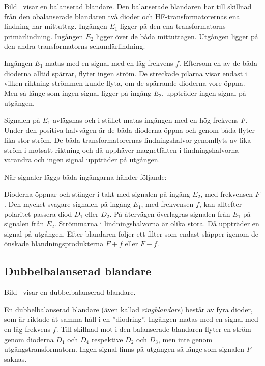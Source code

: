 
Bild~ visar en balanserad blandare.
Den balanserade blandaren har till skillnad från den obalanserade blandaren två
dioder och HF-transformatorernas ena lindning har mittuttag.
Ingången \(E_1\) ligger på den ena transformatorns primärlindning.
Ingången \(E_2\) ligger över de båda mittuttagen.
Utgången ligger på den andra transformatorns sekundärlindning.

Ingången \(E_1\) matas med en signal med en låg frekvens \(f\).
Eftersom en av de båda dioderna alltid spärrar, flyter ingen ström.
De streckade pilarna visar endast i vilken riktning strömmen kunde flyta, om de
spärrande dioderna vore öppna.
Men så länge som ingen signal ligger på ingång \(E_2\), uppträder ingen
signal på utgången.

Signalen på \(E_1\) avlägsnas och i stället matas ingången med en hög
frekvens \(F\).
Under den positiva halvvågen är de båda dioderna öppna och genom båda flyter
lika stor ström.
De båda transformatorernas lindningshalvor genomflyts av lika ström i motsatt
riktning och då upphäver magnetfälten i lindningshalvorna varandra och ingen
signal uppträder på utgången.

När signaler läggs båda ingångarna händer följande:

Dioderna öppnar och stänger i takt med signalen på ingång \(E_2\), med
frekvensen \(F\).
Den mycket svagare signalen på ingång \(E_1\), med frekvensen \(f\), kan
alltefter polaritet passera diod \(D_1\) eller \(D_2\).
På återvägen överlagras signalen från \(E_1\) på signalen från \(E_2\).
Strömmarna i lindningshalvorna är olika stora.
Då uppträder en signal på utgången.
Efter blandaren följer ett filter som endast släpper igenom de önskade
blandningsprodukterna \(F + f\) eller \(F - f\).

\subsection{Dubbelbalanserad blandare}


Bild~ visar en dubbelbalanserad blandare.

En dubbelbalanserad blandare (även kallad \emph{ringblandare}) består av fyra
dioder, som är riktade åt samma håll i en ''diodring''.
Ingången matas med en signal med en låg frekvens \(f\).
Till skillnad mot i den balanserade blandaren flyter en ström genom dioderna
\(D_1\) och \(D_4\) respektive \(D_2\) och \(D_3\), men inte genom
utgångstransformatorn.
Ingen signal finns på utgången så länge som signalen \(F\) saknas.

